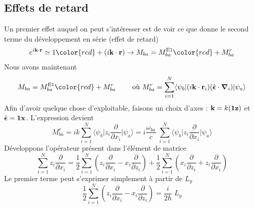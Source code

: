 \subsection{Effets de retard}
Un premier effet auquel on peut s'intéresser est de voir ce que donne le second terme du développement
en série (effet de retard)
\begin{equation}
e^{i {\bf k} \cdot {\bf r} } \simeq  1 
{\color{red} + (i {\bf k} \cdot {\bf r} )  }
\rightarrow
M_{ba} 
= M_{ba}^{\rm{E1}}  
{\color{red} + M_{ba}^r }
\end{equation}
Nous avons maintenant
\begin{equation}
M_{ba} 
= M_{ba}^{\rm{E1}}  
{\color{red} + M_{ba}^r }\qquad\text{ où } M_{ba}^r = 
\sum_{i= 1}^N 
 \langle \psi_b \vert 
 (i {\bf k} \cdot {\bf r}_i )
(  \hat{  \mbox{\boldmath $ \epsilon $}} \cdot 
\mbox{\boldmath $ \nabla $} _i ) \vert \psi_a \rangle
\end{equation}
Afin d'avoir quelque chose d'exploitable, faisons un choix d'axes : $ {\bf k}  = k ( {\bf 1z} )$ et $
 \hat{  \mbox{\boldmath $ \epsilon $}} = {\bf 1x}$. L'expression devient
\begin{equation}
M_{ba}^r =  i k
\sum_{i= 1}^N 
 \langle \psi_b \vert 
 z_i \frac{\partial}{\partial x_i} \vert \psi_a \rangle
= i \frac{\omega_{ba}}{c} \; 
\sum_{i= 1}^N 
 \langle \psi_b \vert 
 z_i \frac{\partial}{\partial x_i} \vert \psi_a \rangle
\end{equation}
Développons l'opérateur présent dans l'élément de matrice
\begin{equation}
\sum_{i= 1}^N 
 z_i \frac{\partial}{\partial x_i}
= \frac{1}{2}  \sum_{i= 1}^N
\left(  
 z_i \frac{\partial}{\partial x_i} 
- x_i \frac{\partial}{\partial z_i} 
\right)
+
\frac{1}{2}  \sum_{i= 1}^N
\left(  
 x_i \frac{\partial}{\partial z_i} 
+ z_i \frac{\partial}{\partial x_i} 
\right)
\end{equation}
Le premier terme peut s'exprimer simplement à partir de $L_y$
\begin{equation}
\frac{1}{2}  \sum_{i= 1}^N
\left(  
 z_i \frac{\partial}{\partial x_i} 
- x_i \frac{\partial}{\partial z_i} 
\right)
=
\frac{i}{2 \hbar} \; L_y
\end{equation}

